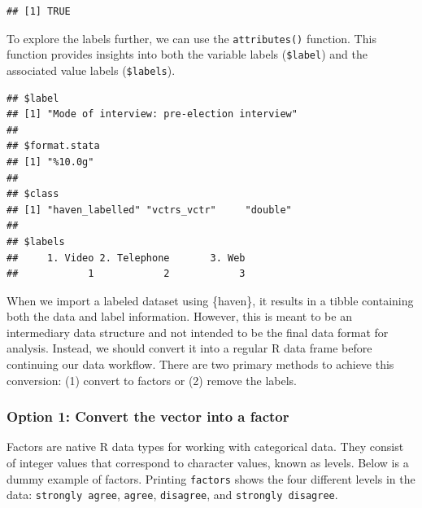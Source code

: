 \documentclass[
]{krantz}
\makeatletter
\newenvironment{Shaded}{\begin{snugshade}}{\end{snugshade}}
\newcommand{\FunctionTok}[1]{\textcolor[rgb]{0.27,0.27,0.27}{\textbf{#1}}}
\newcommand{\NormalTok}[1]{#1}
\newcommand{\SpecialCharTok}[1]{\textcolor[rgb]{0.43,0.43,0.43}{\textbf{#1}}}
\newenvironment{kframe}{%
\medskip{}
\setlength{\fboxsep}{.8em}
 \def\at@end@of@kframe{}%
 \ifinner\ifhmode%
  \def\at@end@of@kframe{\end{minipage}}%
  \begin{minipage}{\columnwidth}%
 \fi\fi%
 \def\FrameCommand##1{\hskip\@totalleftmargin \hskip-\fboxsep
 \colorbox{shadecolor}{##1}\hskip-\fboxsep
     \hskip-\linewidth \hskip-\@totalleftmargin \hskip\columnwidth}%
 \MakeFramed {\advance\hsize-\width
   \@totalleftmargin\z@ \linewidth\hsize
   \@setminipage}}%
 {\par\unskip\endMakeFramed%
 \at@end@of@kframe}
\renewenvironment{Shaded}{\begin{kframe}}{\end{kframe}}
\makeatother
\begin{document}
\begin{verbatim}
## [1] TRUE
\end{verbatim}

To explore the labels further, we can use the \texttt{attributes()} function. This function provides insights into both the variable labels (\texttt{\$label}) and the associated value labels (\texttt{\$labels}).

\begin{Shaded}
\end{Shaded}

\begin{verbatim}
## $label
## [1] "Mode of interview: pre-election interview"
## 
## $format.stata
## [1] "%10.0g"
## 
## $class
## [1] "haven_labelled" "vctrs_vctr"     "double"        
## 
## $labels
##     1. Video 2. Telephone       3. Web 
##            1            2            3
\end{verbatim}

When we import a labeled dataset using \{haven\}, it results in a tibble containing both the data and label information. However, this is meant to be an intermediary data structure and not intended to be the final data format for analysis. Instead, we should convert it into a regular R data frame before continuing our data workflow. There are two primary methods to achieve this conversion: (1) convert to factors or (2) remove the labels.

\hypertarget{option-1-convert-the-vector-into-a-factor}{%
\subsubsection*{Option 1: Convert the vector into a factor}\label{option-1-convert-the-vector-into-a-factor}}


Factors are native R data types for working with categorical data. They consist of integer values that correspond to character values, known as levels. Below is a dummy example of factors. Printing \texttt{factors} shows the four different levels in the data: \texttt{strongly\ agree}, \texttt{agree}, \texttt{disagree}, and \texttt{strongly\ disagree}.
\end{document}
